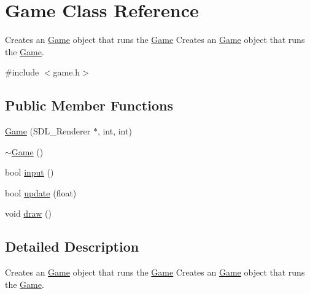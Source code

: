 \hypertarget{class_game}{\section{Game Class Reference}
\label{class_game}
}


Creates an \hyperlink{class_game}{Game} object that runs the \hyperlink{class_game}{Game} Creates an \hyperlink{class_game}{Game} object that runs the \hyperlink{class_game}{Game}.  




{\ttfamily \#include $<$game.\+h$>$}

\subsection*{Public Member Functions}
\begin{DoxyCompactItemize}
\item 
\hyperlink{class_game_aa16f7f0fe07387c1fda7f27858b2ff66}{Game} (S\+D\+L\+\_\+\+Renderer $\ast$, int, int)
\item 
\hyperlink{class_game_ae3d112ca6e0e55150d2fdbc704474530}{$\sim$\+Game} ()
\item 
bool \hyperlink{class_game_a6e3ee4ac1c5ee591527cd13cfb4cfab2}{input} ()
\item 
bool \hyperlink{class_game_a34db1b512678bf1bf0bd8e0d56723b18}{update} (float)
\item 
void \hyperlink{class_game_a6d54497ce3a66f6dd45eacfdccc8d0bd}{draw} ()
\end{DoxyCompactItemize}


\subsection{Detailed Description}
Creates an \hyperlink{class_game}{Game} object that runs the \hyperlink{class_game}{Game} Creates an \hyperlink{class_game}{Game} object that runs the \hyperlink{class_game}{Game}. 


